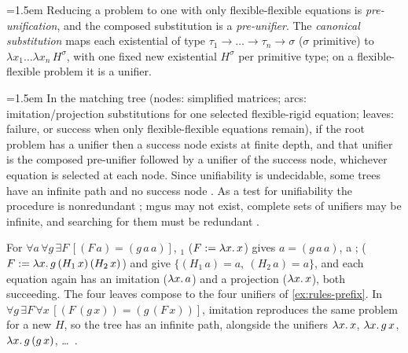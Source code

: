 \begin{definition}\label{def:rules-preunif}\emergencystretch=1.5em
Reducing a problem to one with only flexible-flexible equations is \emph{pre-unification}, and the composed substitution is a \emph{pre-unifier}.
The \emph{canonical substitution} maps each existential of type $\tau_1\to\dots\to\tau_n\to\sigma$ ($\sigma$ primitive) to $\lambda x_1\dots\allowbreak\lambda x_n\,H^\sigma$, with one fixed new existential $H^\sigma$ per primitive type; on a flexible-flexible problem it is a unifier.
\end{definition}

\begin{theorem}\label{thm:rules-matching}\emergencystretch=1.5em
In the matching tree (nodes: simplified matrices; arcs: imitation\slash projection substitutions for one selected flexible-rigid equation; leaves: failure, or success when only flexible-flexible equations remain), if the root problem has a unifier then a success node exists at finite depth, and that unifier is the composed pre-unifier followed by a unifier of the success node, whichever equation is selected at each node.
Since unifiability is undecidable, some trees have an infinite path and no success node .
As a test for unifiability the procedure is nonredundant ; mgus may not exist, complete sets of unifiers may be infinite, and searching for them must be redundant .
\end{theorem}

\begin{example}\label{ex:rules-huet}
For $\forall a\,\forall g\,\exists F\,\allowbreak[(F\,a)=(g\,a\,a)]$, $_1$ ($F:=\lambda x.\,x$) gives $a=(g\,a\,a)$, a ;  ($F:=\lambda x.\,g\,(H_1\,x)\,(H_2\,x)$) and  give $\{(H_1\,a)=a,\ (H_2\,a)=a\}$, and each equation again has an imitation ($\lambda x.\,a$) and a projection ($\lambda x.\,x$), both succeeding.
The four leaves compose to the four unifiers of \cref{ex:rules-prefix}.
In $\forall g\,\exists F\,\forall x\,\allowbreak[(F\,(g\,x))=(g\,(F\,x))]$, imitation reproduces the same problem for a new $H$, so the tree has an infinite path, alongside the unifiers $\lambda x.\,x$, $\lambda x.\,g\,x$, $\lambda x.\,g\,(g\,x)$, \dots\ .
\end{example}

